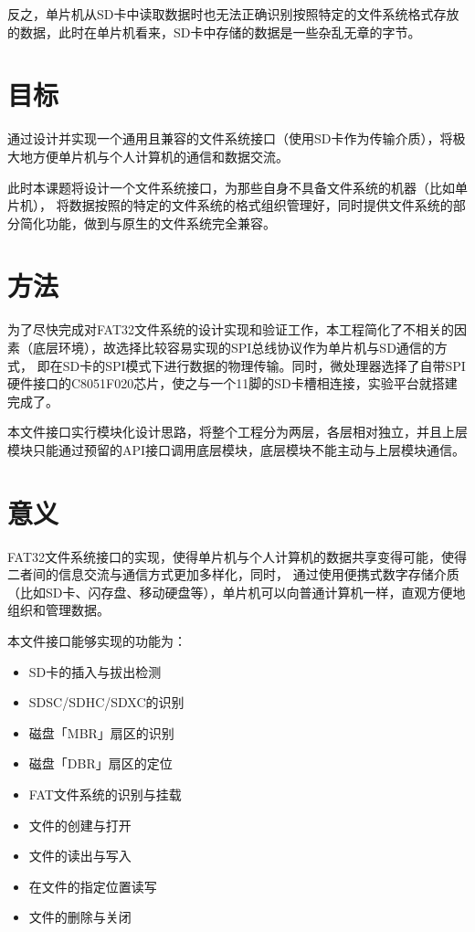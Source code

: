 反之，单片机从SD卡中读取数据时也无法正确识别按照特定的文件系统格式存放的数据，此时在单片机看来，SD卡中存储的数据是一些杂乱无章的字节。

\section{目标}
\label{sec:Goals}
通过设计并实现一个通用且兼容的文件系统接口（使用SD卡作为传输介质），将极大地方便单片机\supercite{fat6}与个人计算机的通信和数据交流。

此时本课题将设计一个文件系统\supercite{fatfs}接口，为那些自身不具备文件系统的机器（比如单片机），
将数据按照的特定的文件系统的格式组织管理好，同时提供文件系统的部分简化功能，做到与原生的文件系统完全兼容。

\section{方法}
\label{sec:Solution}
为了尽快完成对FAT32文件系统的设计实现和验证工作，本工程简化了不相关的因素（底层环境），故选择比较容易实现的SPI总线协议\supercite{spi1}作为单片机与SD通信\supercite{sdfat1,sdfat2}的方式，
即在SD卡的SPI模式下进行数据的物理传输。同时，微处理器选择了自带SPI硬件接口的C8051F020芯片，使之与一个11脚的SD卡槽相连接，实验平台就搭建完成了。

本文件接口实行模块化设计思路，将整个工程分为两层，各层相对独立，并且上层模块只能通过预留的API接口调用底层模块，底层模块不能主动与上层模块通信。

\section{意义}
\label{sec:Contributions}
FAT32文件系统接口的实现，使得单片机与个人计算机的数据共享变得可能，使得二者间的信息交流与通信方式更加多样化，同时，
通过使用便携式数字存储介质（比如SD卡、闪存盘、移动硬盘等），单片机可以向普通计算机一样，直观方便地组织和管理数据。

本文件接口能够实现的功能为：
\begin{itemize}[noitemsep,topsep=0pt,parsep=0pt,partopsep=0pt,leftmargin=5cm]
    \item SD卡的插入与拔出检测
    \item SDSC/SDHC/SDXC的识别
    \item 磁盘「MBR」扇区的识别
    \item 磁盘「DBR」扇区的定位
    \item FAT文件系统的识别与挂载
    \item 文件的创建与打开
    \item 文件的读出与写入
    \item 在文件的指定位置读写
    \item 文件的删除与关闭
\end{itemize}


